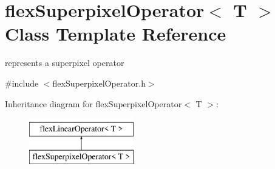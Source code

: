 \hypertarget{classflex_superpixel_operator}{}\section{flex\+Superpixel\+Operator$<$ T $>$ Class Template Reference}
\label{classflex_superpixel_operator}


represents a superpixel operator  




{\ttfamily \#include $<$flex\+Superpixel\+Operator.\+h$>$}

Inheritance diagram for flex\+Superpixel\+Operator$<$ T $>$\+:\begin{figure}[H]
\begin{center}
\leavevmode
\includegraphics[height=2.000000cm]{classflex_superpixel_operator}
\end{center}
\end{figure}
